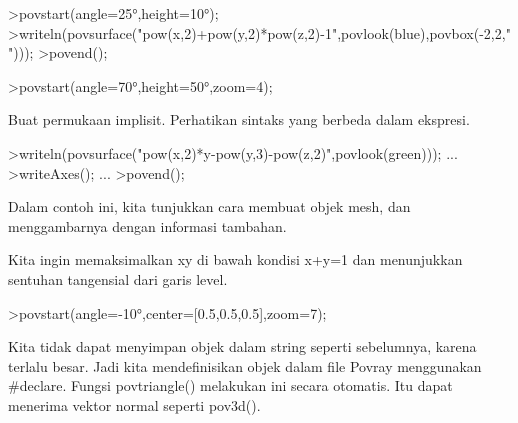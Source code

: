 \documentclass{article}
\begin{document}
\begin{eulernotebook}
\begin{eulercomment}
\begin{eulercomment}
\begin{euleroutput}
\end{euleroutput}
\begin{eulerprompt}
>povstart(angle=25°,height=10°);
>writeln(povsurface("pow(x,2)+pow(y,2)*pow(z,2)-1",povlook(blue),povbox(-2,2,"")));
>povend();
\end{eulerprompt}
\begin{eulerprompt}
>povstart(angle=70°,height=50°,zoom=4);
\end{eulerprompt}
\begin{eulercomment}
Buat permukaan implisit. Perhatikan sintaks yang berbeda dalam
ekspresi.
\end{eulercomment}
\begin{eulerprompt}
>writeln(povsurface("pow(x,2)*y-pow(y,3)-pow(z,2)",povlook(green))); ...
>writeAxes(); ...
>povend();
\end{eulerprompt}
\begin{eulercomment}
Dalam contoh ini, kita tunjukkan cara membuat objek mesh, dan
menggambarnya dengan informasi tambahan.

Kita ingin memaksimalkan xy di bawah kondisi x+y=1 dan menunjukkan
sentuhan tangensial dari garis level.
\end{eulercomment}
\begin{eulerprompt}
>povstart(angle=-10°,center=[0.5,0.5,0.5],zoom=7);
\end{eulerprompt}
\begin{eulercomment}
Kita tidak dapat menyimpan objek dalam string seperti sebelumnya,
karena terlalu besar. Jadi kita mendefinisikan objek dalam file Povray
menggunakan #declare. Fungsi povtriangle() melakukan ini secara
otomatis. Itu dapat menerima vektor normal seperti pov3d().


\end{eulercomment}
\end{eulercomment}
\end{eulercomment}
\end{eulernotebook}
\end{document}
